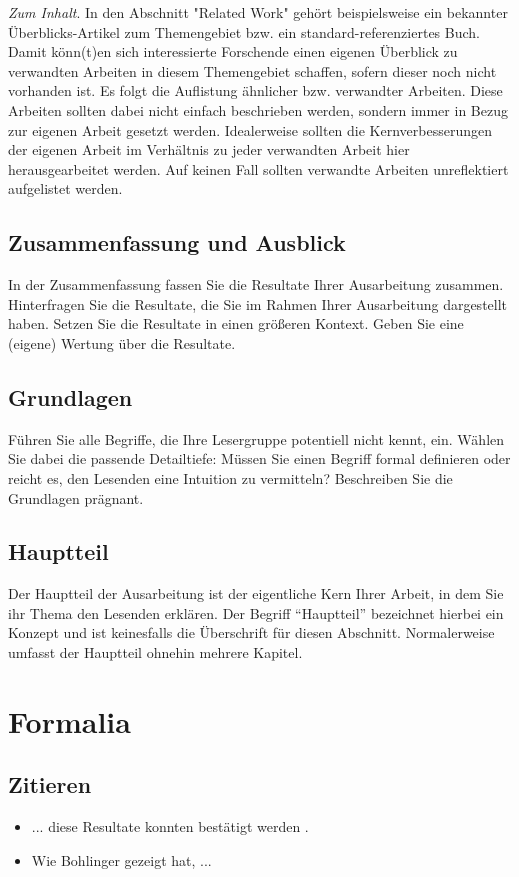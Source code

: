 \noindent
\emph{Zum Inhalt}.
In den Abschnitt "Related Work" gehört beispielsweise ein bekannter Überblicks-Artikel zum
Themengebiet bzw. ein standard-referenziertes Buch.
Damit könn(t)en sich interessierte Forschende einen eigenen Überblick zu verwandten Arbeiten in
diesem Themengebiet schaffen, sofern dieser noch nicht vorhanden ist.
Es folgt die Auflistung ähnlicher bzw. verwandter Arbeiten.
Diese Arbeiten sollten dabei nicht einfach beschrieben werden, sondern immer in Bezug zur eigenen
Arbeit gesetzt werden.
Idealerweise sollten die Kernverbesserungen der eigenen Arbeit im Verhältnis zu jeder verwandten
Arbeit hier herausgearbeitet werden.
Auf keinen Fall sollten verwandte Arbeiten unreflektiert aufgelistet werden.

\subsection{Zusammenfassung und Ausblick}
In der Zusammenfassung fassen Sie die Resultate Ihrer Ausarbeitung zusammen. Hinterfragen Sie die
Resultate, die Sie im Rahmen Ihrer Ausarbeitung dargestellt haben. Setzen Sie die Resultate in einen
größeren Kontext. Geben Sie eine (eigene) Wertung über die Resultate.



\subsection{Grundlagen}
Führen Sie alle Begriffe, die Ihre Lesergruppe potentiell nicht kennt, ein. Wählen Sie dabei die
passende Detailtiefe: Müssen Sie einen Begriff formal definieren oder reicht es, den Lesenden eine
Intuition zu vermitteln? Beschreiben Sie die Grundlagen prägnant.

\subsection{Hauptteil}
Der Hauptteil der Ausarbeitung ist der eigentliche Kern Ihrer Arbeit, in dem Sie ihr Thema den Lesenden
erklären. Der Begriff ``Hauptteil'' bezeichnet hierbei ein Konzept und ist keinesfalls die
Überschrift für diesen Abschnitt. Normalerweise umfasst der Hauptteil ohnehin mehrere Kapitel.

\section{Formalia}

\subsection{Zitieren}
\begin{itemize}
\item ... diese Resultate konnten bestätigt werden \cite{stickel2009wissenschaftliches}.
\item Wie Bohlinger \cite{BOH07} gezeigt hat, ...
\end{itemize}

